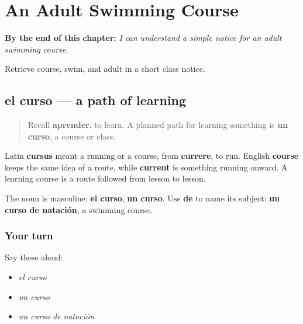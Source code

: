 
\chapter{An Adult Swimming Course}
\label{ch:curso-nadar-adulto}

\begin{chapteropening}
\textbf{By the end of this chapter:} \emph{I can understand a simple notice for an adult swimming course.}

Retrieve course, swim, and adult in a short class notice.
\end{chapteropening}

\section[el curso]{el curso — a path of learning}

\label{lesson:ES-C417-curso}



\begin{quote}
Recall \textbf{aprender}, to learn. A planned path for learning something is \textbf{un curso}, a course or class.
\end{quote}

\begin{cousinweb}
Latin \textbf{cursus} meant a running or a course, from \textbf{currere}, to run. English \textbf{course} keeps the same idea of a route, while \textbf{current} is something running onward. A learning course is a route followed from lesson to lesson.
\end{cousinweb}

\begin{grammarlens}[title={Grammar Lens: name the subject}]
The noun is masculine: \textbf{el curso}, \textbf{un curso}. Use \textbf{de} to name its subject: \textbf{un curso de natación}, a swimming course.
\end{grammarlens}

\subsection*{Your turn}
Say these aloud:

\begin{itemize}
\raggedright
  \item \emph{el curso}
  \item \emph{un curso}
  \item \emph{un curso de natación}
\end{itemize}

